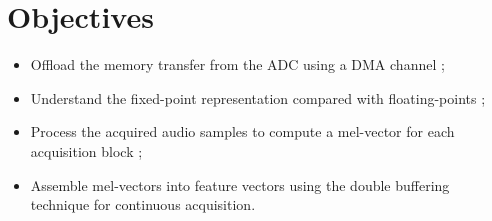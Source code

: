 \section*{Objectives}

\begin{itemize}
    \item Offload the memory transfer from the ADC using a DMA channel ;
    \item Understand the fixed-point representation compared with floating-points ;
    \item Process the acquired audio samples to compute a mel-vector for each acquisition block ;
    \item Assemble mel-vectors into feature vectors using the double buffering technique for continuous acquisition.
\end{itemize}
